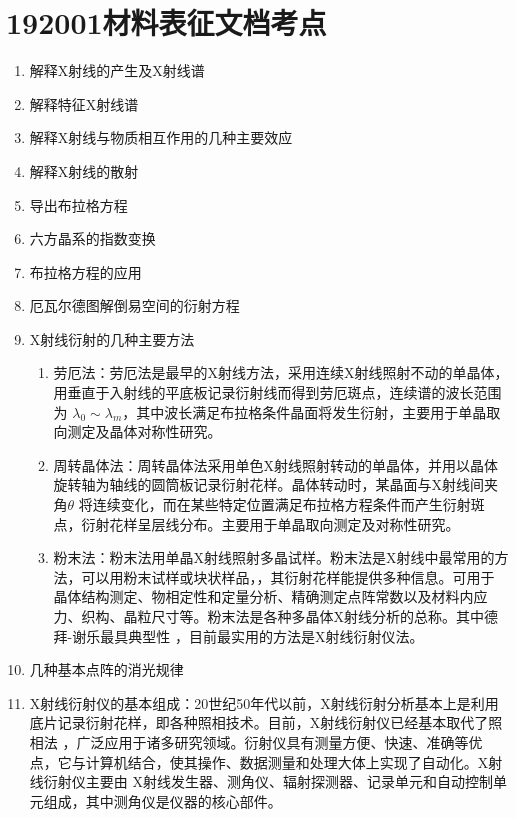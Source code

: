 \documentclass[12pt,a4paper]{article}
\begin{document}
    \section{192001材料表征文档考点}
    \begin{enumerate}
        \item 解释X射线的产生及X射线谱
        \item 解释特征X射线谱
        \item 解释X射线与物质相互作用的几种主要效应
        \item 解释X射线的散射
        \item 导出布拉格方程
        \item 六方晶系的指数变换
        \item 布拉格方程的应用
        \item 厄瓦尔德图解倒易空间的衍射方程
        \item X射线衍射的几种主要方法
        \begin{enumerate}
            \item 劳厄法：劳厄法是最早的X射线方法，采用连续X射线照射不动的单晶体，用垂直于入射线的平底板记录衍射线而得到劳厄斑点，连续谱的波长范围为
                $\lambda_{0} \sim \lambda_{m}$，其中波长满足布拉格条件晶面将发生衍射，主要用于单晶取向测定及晶体对称性研究。
            \item 周转晶体法：周转晶体法采用单色X射线照射转动的单晶体，并用以晶体旋转轴为轴线的圆筒板记录衍射花样。晶体转动时，某晶面与X射线间夹角$\theta$
                将连续变化，而在某些特定位置满足布拉格方程条件而产生衍射斑点，衍射花样呈层线分布。主要用于单晶取向测定及对称性研究。
            \item 粉末法：粉末法用单晶X射线照射多晶试样。粉末法是X射线中最常用的方法，可以用粉末试样或块状样品，，其衍射花样能提供多种信息。可用于
                晶体结构测定、物相定性和定量分析、精确测定点阵常数以及材料内应力、织构、晶粒尺寸等。粉末法是各种多晶体X射线分析的总称。其中德拜-谢乐最具典型性
                ，目前最实用的方法是X射线衍射仪法。
        \end{enumerate}
        \item 几种基本点阵的消光规律
        \item X射线衍射仪的基本组成：20世纪50年代以前，X射线衍射分析基本上是利用底片记录衍射花样，即各种照相技术。目前，X射线衍射仪已经基本取代了照相法
            ，广泛应用于诸多研究领域。衍射仪具有测量方便、快速、准确等优点，它与计算机结合，使其操作、数据测量和处理大体上实现了自动化。X射线衍射仪主要由
            X射线发生器、测角仪、辐射探测器、记录单元和自动控制单元组成，其中测角仪是仪器的核心部件。

\end{enumerate}
\end{document}
